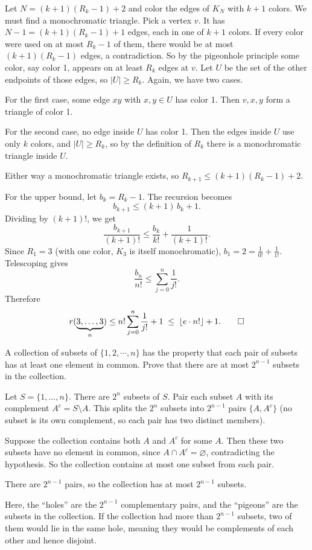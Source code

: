 \begin{solution}
  Let $N=(k+1)(R_k-1)+2$ and color the edges of $K_N$ with $k+1$ colors. We must find a monochromatic triangle. Pick a vertex $v$. It has $N-1=(k+1)(R_k-1)+1$ edges, each in one of $k+1$ colors. If every color were used on at most $R_k-1$ of them, there would be at most $(k+1)(R_k-1)$ edges, a contradiction. So by the pigeonhole principle some color, say color 1, appears on at least $R_k$ edges at $v$. Let $U$ be the set of the other endpoints of those edges, so $|U|\ge R_k$.
  Again, we have two cases.

  For the first case, some edge $xy$ with $x,y\in U$ has color 1. Then $v,x,y$ form a triangle of color 1.

  For the second case, no edge inside $U$ has color 1. Then the edges inside $U$ use only $k$ colors, and $|U|\ge R_k$, so by the definition of $R_k$ there is a monochromatic triangle inside $U$.

  Either way a monochromatic triangle exists, so $R_{k+1}\le (k+1)(R_k-1)+2$.

  For the upper bound, let $b_k=R_k-1$. The recursion becomes
  \[%
    b_{k+1}\le (k+1)\,b_k+1
  .\]%
  Dividing by $(k+1)!$, we get
  \[%
    \frac{b_{k+1}}{(k+1)!}\le \frac{b_k}{k!}+\frac{1}{(k+1)!}
  .\]%
  Since $R_1=3$ (with one color, $K_3$ is itself monochromatic), $b_1=2=\frac1{0!}+\frac1{1!}$. Telescoping gives
  \[%
    \frac{b_n}{n!}\le \sum_{j=0}^{n}\frac1{j!}
  .\]%
  Therefore
  \[%
    r(\underbrace{3,\dots,3}_{n}) \le n!\sum_{j=0}^{n}\frac1{j!}+1 \;\le\; \lfloor e\cdot n!\rfloor+1
  .\qedhere\]%
\end{solution}

\begin{problem}[27]
  A collection of subsets of $\{1, 2, \cdots, n\}$ has the property that each pair of subsets has at least one element in common. Prove that there are at most $2^{n-1}$ subsets in the collection.
\end{problem}

\begin{solution}
  Let $S=\{1,\dots,n\}$. There are $2^n$ subsets of $S$. Pair each subset $A$ with its complement $A^c = S\setminus A$. This splits the $2^n$ subsets into $2^{n-1}$ pairs $\{A, A^c\}$ (no subset is its own complement, so each pair has two distinct members).

  Suppose the collection contains both $A$ and $A^c$ for some $A$. Then these two subsets have no element in common, since $A\cap A^c=\varnothing$, contradicting the hypothesis. So the collection contains at most one subset from each pair.

  There are $2^{n-1}$ pairs, so the collection has at most $2^{n-1}$ subsets.

  Here, the ``holes'' are the $2^{n-1}$ complementary pairs, and the ``pigeons'' are the subsets in the collection. If the collection had more than $2^{n-1}$ subsets, two of them would lie in the same hole, meaning they would be complements of each other and hence disjoint.
\end{solution}
